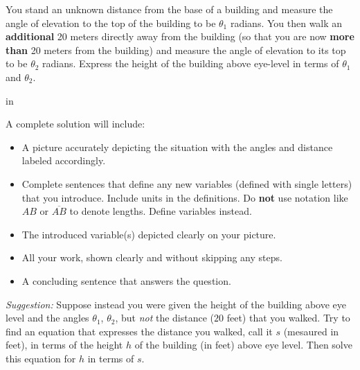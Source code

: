 \documentclass{ximera}
\newcommand{\pskip}{\vskip 0.1 in}
\begin{document}
\begin{question}  \label{Q34ftt4g}
You stand an unknown distance from the base of a building and measure the angle of elevation to the top of the building to be $\theta_1$ radians. You then walk an {\bf additional} 20 meters directly away from the building (so that you are now {\bf more than} 20 meters from the building) and measure the angle of elevation to its top to be $\theta_2$ radians. Express the height of the building above eye-level in terms of $\theta_1$ and $\theta_2$.


\pskip


A complete solution will include:

\begin{itemize}
\item{A picture accurately depicting the situation with the angles and distance labeled accordingly.}

\item{Complete sentences that define any new variables (defined with single letters) that you introduce. Include units in the definitions. Do {\bf not} use notation like $AB$ or $\overline{AB}$ to denote lengths. Define variables instead.}

\item{The introduced variable(s) depicted clearly on your picture.}

\item{All your work, shown clearly and without skipping any steps.}

\item{A concluding sentence that answers the question.}

\end{itemize}

\emph{Suggestion:} Suppose instead you were given the height of the building above eye level and the angles $\theta_1$, $\theta_2$, but \emph{not} the distance ($20$ feet) that you walked. Try to find an equation that expresses the distance you walked, call it $s$ (mesaured in feet), in terms of the height  $h$ of the building (in feet) above eye level. Then solve this equation for $h$ in terms of $s$.

\end{question}
\end{document}
